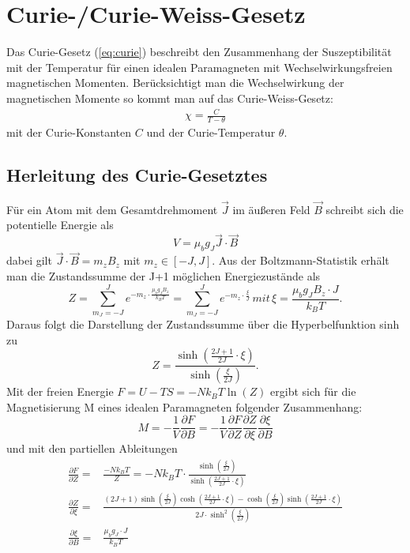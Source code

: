 \documentclass[twoside,colorback,accentcolor=tud4c,11pt]{tudreport}
\begin{document}
\section{Curie-/Curie-Weiss-Gesetz}\label{sec:curie}
Das Curie-Gesetz (\ref{eq:curie}) beschreibt den Zusammenhang der Suszeptibilität mit der Temperatur für einen idealen Paramagneten mit Wechselwirkungsfreien magnetischen Momenten. Berücksichtigt man die Wechselwirkung der magnetischen Momente so kommt man auf das Curie-Weiss-Gesetz:
\begin{align}\label{eq:weiss}
\chi=\frac{C}{T-\theta}
\end{align}
mit der Curie-Konstanten $C$ und der Curie-Temperatur $\theta$.
\subsection{Herleitung des Curie-Gesetztes}
Für ein Atom mit dem Gesamtdrehmoment $\vec{J}$ im äußeren Feld $\vec{B}$ schreibt sich die potentielle Energie als
\begin{equation}
V=\mu_{b} g_{J}\vec{J}\cdot\vec{B}
\end{equation}
dabei gilt $\vec{J}\cdot\vec{B} =m_{z}B_{z}$ mit $m_{z}\in\left[-J,J\right]$. Aus der Boltzmann-Statistik erhält man die Zustandssumme der J+1 möglichen Energiezustände als
\begin{equation}
Z=\sum_{m_{J}=-J}^{J} e^{-m_{z}\cdot\frac{\mu_{b}g_{J}B_{z}}{k_{B}T}}=\sum_{m_{J}=-J}^{J} e^{-m_{z}\cdot\frac{\xi}{J}}\,mit\, \xi = \frac{\mu_{b}g_{J}B_{z}\cdot J}{k_{B}T}.
\end{equation}
Daraus folgt die Darstellung der Zustandssumme über die Hyperbelfunktion sinh zu
\begin{equation}
Z=\frac{\sinh\left(\frac{2J+1}{2J}\cdot\xi\right)}{\sinh\left(\frac{\xi}{2J}\right)}.
\end{equation}
Mit der freien Energie $F=U-TS=-Nk_{B}T\ln(Z)$ ergibt sich für die Magnetisierung M eines idealen Paramagneten folgender Zusammenhang:
\begin{equation}
M=-\frac{1}{V}\frac{\partial F}{\partial B}=-\frac{1}{V}\frac{\partial F}{\partial Z}\frac{\partial Z}{\partial \xi}\frac{\partial \xi}{\partial B}
\end{equation}
und mit den partiellen Ableitungen
\begin{align}
\frac{\partial F}{\partial Z}=&\frac{-Nk_{B}T}{Z}=-Nk_{B}T\cdot\frac{\sinh\left(\frac{\xi}{2J}\right)}{\sinh\left(\frac{2J+1}{2J}\cdot\xi\right)}\\
\frac{\partial Z}{\partial \xi}=&\frac{(2J+1)\sinh\left(\frac{\xi}{2J}\right)\cosh\left(\frac{2J+1}{2J}\cdot\xi\right)-\cosh\left(\frac{\xi}{2J}\right)\sinh\left(\frac{2J+1}{2J}\cdot\xi\right)}{2J\cdot\sinh^2\left(\frac{\xi}{2J}\right)}\\
\frac{\partial \xi}{\partial B}=&\frac{\mu_{b}g_{J}\cdot J}{k_{B}T}
\end{align}
\end{document}
